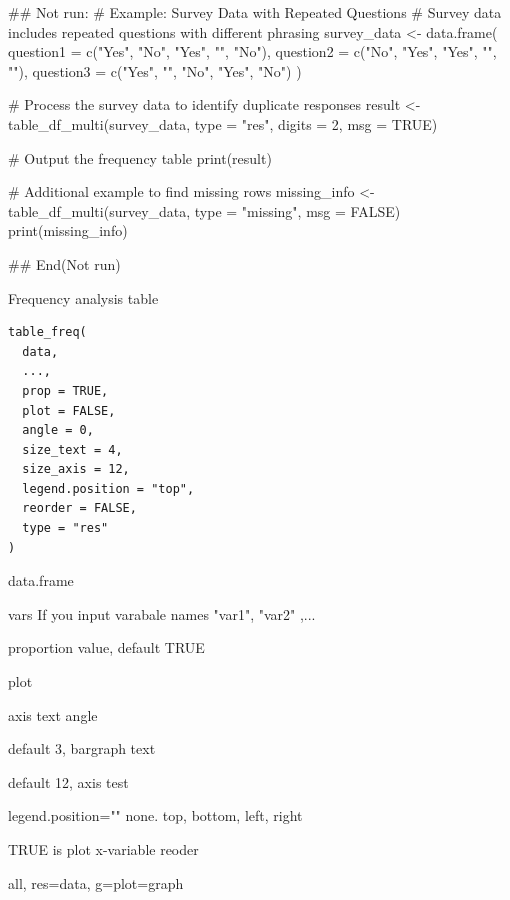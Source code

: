 \documentclass[a4paper]{book}
\begin{document}
\begin{Examples}
\begin{ExampleCode}
\#\# Not run: 
# Example: Survey Data with Repeated Questions
# Survey data includes repeated questions with different phrasing
survey_data <- data.frame(
  question1 = c("Yes", "No", "Yes", "", "No"),
  question2 = c("No", "Yes", "Yes", "", ""),
  question3 = c("Yes", "", "No", "Yes", "No")
)

# Process the survey data to identify duplicate responses
result <- table_df_multi(survey_data, type = "res", digits = 2, msg = TRUE)

# Output the frequency table
print(result)

# Additional example to find missing rows
missing_info <- table_df_multi(survey_data, type = "missing", msg = FALSE)
print(missing_info)

## End(Not run)
\end{ExampleCode}
\end{Examples}
%
\begin{Description}
Frequency analysis table
\end{Description}
%
\begin{Usage}
\begin{verbatim}
table_freq(
  data,
  ...,
  prop = TRUE,
  plot = FALSE,
  angle = 0,
  size_text = 4,
  size_axis = 12,
  legend.position = "top",
  reorder = FALSE,
  type = "res"
)
\end{verbatim}
\end{Usage}
%
\begin{Arguments}
\begin{ldescription}
\item[\code{data}] data.frame

\item[\code{...}] vars If you input varabale names "var1", "var2" ,...

\item[\code{prop}] proportion value, default TRUE

\item[\code{plot}] plot

\item[\code{angle}] axis text angle

\item[\code{size\_text}] default 3, bargraph text

\item[\code{size\_axis}] default 12, axis test

\item[\code{legend.position}] legend.position="" none. top, bottom, left, right

\item[\code{reorder}] TRUE is plot x-variable reoder

\item[\code{type}] all, res=data, g=plot=graph
\end{ldescription}
\end{Arguments}
\end{document}
